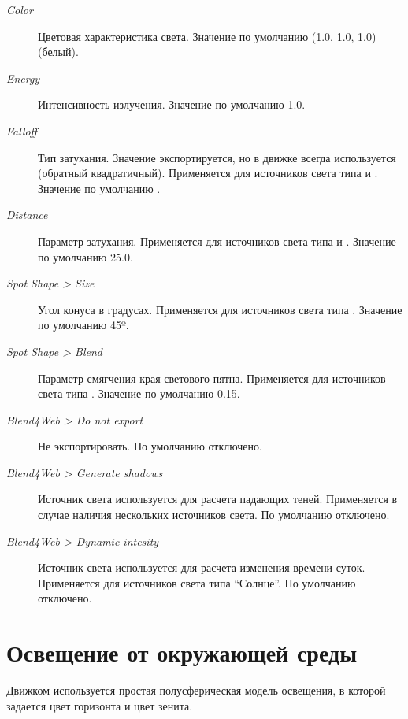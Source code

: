 \documentclass[a4paper,12pt,oneside]{sphinxmanual}
\begin{document}
\begin{DUlineblock}{0em}
\item[] 
\end{DUlineblock}
\begin{description}
\item[{\emph{Color}}] \leavevmode
Цветовая характеристика света. Значение по умолчанию (1.0, 1.0, 1.0) (белый).

\item[{\emph{Energy}}] \leavevmode
Интенсивность излучения. Значение по умолчанию 1.0.

\item[{\emph{Falloff}}] \leavevmode
Тип затухания. Значение экспортируется, но в движке всегда используется  (обратный квадратичный). Применяется для источников света типа  и . Значение по умолчанию .

\item[{\emph{Distance}}] \leavevmode
Параметр затухания. Применяется для источников света типа  и . Значение по умолчанию 25.0.

\item[{\emph{Spot Shape \textgreater{} Size}}] \leavevmode
Угол конуса в градусах. Применяется для источников света типа . Значение по умолчанию 45º.

\item[{\emph{Spot Shape \textgreater{} Blend}}] \leavevmode
Параметр смягчения края светового пятна. Применяется для источников света типа . Значение по умолчанию 0.15.

\item[{\emph{Blend4Web \textgreater{} Do not export}}] \leavevmode
Не экспортировать. По умолчанию отключено.

\item[{\emph{Blend4Web \textgreater{} Generate shadows}}] \leavevmode
Источник света используется для расчета падающих теней. Применяется в случае наличия нескольких источников света. По умолчанию отключено.

\item[{\emph{Blend4Web \textgreater{} Dynamic intesity}}] \leavevmode
Источник света используется для расчета изменения времени суток. Применяется для источников света типа ``Солнце''. По умолчанию отключено.

\end{description}


\section{Освещение от окружающей среды}
\label{lighting:id5}
Движком используется простая полусферическая модель освещения, в которой задается цвет горизонта и цвет зенита.
\end{document}
